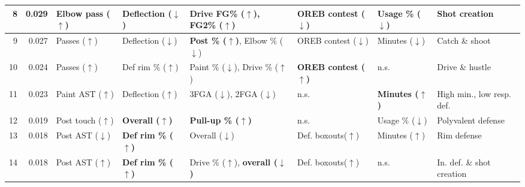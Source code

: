 \begin{tabular}{rrllllll}
\midrule
8 & 0.029 & Elbow pass ($\uparrow$) & Deflection ($\downarrow$) & \textbf{Drive FG\% ($\uparrow$)}, FG2\% ($\uparrow$) & OREB contest ($\downarrow$) & Usage \% ($\downarrow$) & Shot creation \\ 
\midrule
9 & 0.027 & Passes ($\uparrow$) & Deflection ($\downarrow$) & {\bf Post \% ($\uparrow$)}, Elbow \% ($\downarrow$) & OREB contest ($\downarrow$) & Minutes ($\downarrow$) & Catch \& shoot \\ 
\midrule
10 & 0.024 & Passes ($\uparrow$) & Def rim \% ($\uparrow$) & Paint \% ($\downarrow$), Drive \% ($\uparrow$) & {\bf OREB contest ($\uparrow$)} & n.s. & Drive \& hustle \\ 
\midrule
11 & 0.023 & Paint AST ($\uparrow$) & Deflection ($\uparrow$) & 3FGA ($\downarrow$), 2FGA ($\downarrow$) & n.s. & {\bf Minutes ($\uparrow$)} & High min., low resp. def. \\ 
\midrule
12 & 0.019 & Post touch ($\uparrow$) & {\bf Overall ($\uparrow$)} & {\bf Pull-up \% ($\uparrow$)} & n.s. & Usage \% ($\downarrow$) & Polyvalent defense \\ 
\midrule
13 & 0.018 & Post AST ($\downarrow$) & {\bf Def rim \% ($\uparrow$)} & Overall ($\downarrow$) & Def. boxouts($\uparrow$) & Minutes ($\uparrow$) & Rim defense \\ 
\midrule
14 & 0.018 & Post AST ($\uparrow$) & {\bf Def rim \% ($\uparrow$)} & Drive \% ($\uparrow$), {\bf overall ($\downarrow$)} & Def. boxouts($\uparrow$) & n.s. & In. def. \& shot creation \\ 
\bottomrule
\end{tabular}
